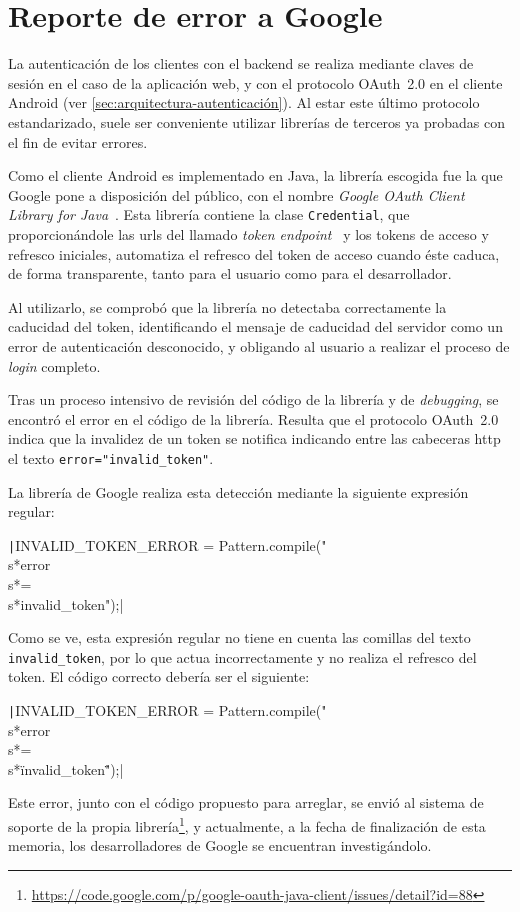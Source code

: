 \documentclass[main]{subfile}
\begin{document}
\chapter{Reporte de error a Google}
\label{sec:google-error-report}
  
La autenticación de los clientes con el \gls{backend} se realiza mediante claves de sesión en el caso de la aplicación web, y con el protocolo OAuth~2.0 en el cliente Android (ver \cref{sec:arquitectura-autenticación}). Al estar este último protocolo estandarizado, suele ser conveniente utilizar librerías de terceros ya probadas con el fin de evitar errores.

Como el cliente Android es implementado en Java, la librería escogida fue la que Google pone a disposición del público, con el nombre \emph{Google OAuth Client Library for Java}~\autocite{google-oauth-client}. Esta librería contiene la clase \texttt{Credential}, que proporcionándole las \glspl{url} del llamado \emph{token endpoint}~\autocite[sec.~3.2]{oauthrfc} y los \glspl{token} de acceso y refresco iniciales, automatiza el refresco del \gls{token} de acceso cuando éste caduca, de forma transparente, tanto para el usuario como para el desarrollador.

Al utilizarlo, se comprobó que la librería no detectaba correctamente la caducidad del \gls{token}, identificando el mensaje de caducidad del servidor como un error de autenticación desconocido, y obligando al usuario a realizar el proceso de \emph{login} completo.

Tras un proceso intensivo de revisión del código de la librería y de \emph{debugging}, se encontró el error en el código de la librería. Resulta que el protocolo OAuth~2.0 indica \autocite[cap.~3]{oauth-bearer-rfc} que la invalidez de un \gls{token} se notifica indicando entre las cabeceras \gls{http} el texto \texttt{error="invalid_token"}.

La librería de Google realiza esta detección mediante la siguiente expresión regular: 

\texttt|INVALID_TOKEN_ERROR = Pattern.compile("\\s*error\\s*=\\s*invalid_token");|

Como se ve, esta expresión regular no tiene en cuenta las comillas del texto \texttt{invalid_token}, por lo que actua incorrectamente y no realiza el refresco del \gls{token}. El código correcto debería ser el siguiente:

\texttt|INVALID_TOKEN_ERROR = Pattern.compile("\\s*error\\s*=\\s*\"invalid_token\"");|

Este error, junto con el código propuesto para arreglar, se envió al sistema de soporte de la propia librería\footnote{\url{https://code.google.com/p/google-oauth-java-client/issues/detail?id=88}}, y actualmente, a la fecha de finalización de esta memoria, los desarrolladores de Google se encuentran investigándolo.
\end{document}
